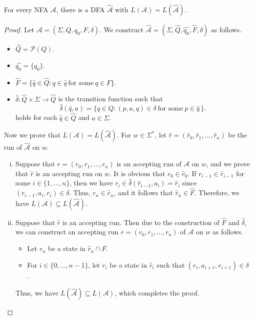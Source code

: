 \begin{theorem}\label{thm:dfa-nfa-equivalence}
  For every NFA $\mathcal{A}$, there is a DFA $\widehat{\mathcal{A}}$ with
  $L(\mathcal{A}) = L(\widehat{\mathcal{A}})$.
\end{theorem}
\begin{proof}
  Let $\mathcal{A} = (\Sigma, Q, q_0, F, \delta)$.
  We construct $\widehat{\mathcal{A}} = (\Sigma, \widehat{Q}, \widehat{q_0},
  \widehat{F}, \widehat{\delta})$ as follows.
  \begin{itemize}
    \item $\widehat{Q} = \mathcal{P}(Q)$.
    \item $\widehat{q_0} = \{q_0\}$.
    \item $\widehat{F} = \{\widehat{q} \in \widehat{Q}:
      q \in \widehat{q}\ \text{for some}\ q \in F\}$.
    \item $\widehat{\delta}: \widehat{Q} \times \Sigma \to \widehat{Q}$ is the
      transition function such that
      \begin{equation*}
        \widehat{\delta}(\widehat{q}, a) = \{q \in Q:
          (p, a, q) \in \delta\ \text{for some}\ p \in \widehat{q}\,\}.
      \end{equation*}
      holds for each $\widehat{q} \in \widehat{Q}$ and $a \in \Sigma$.
  \end{itemize}
  Now we prove that $L(\mathcal{A}) = L(\widehat{\mathcal{A}})$.
  For $w \in \Sigma^*$, let
  $\widehat{r} = (\widehat{r}_0, \widehat{r}_1, \dots, \widehat{r}_n)$ be
  the run of $\widehat{\mathcal{A}}$ on $w$.
  \begin{enumerate}[(i)]
    \item Suppose that $r = (r_0, r_1, \dots, r_n)$ is an accepting run of
      $\mathcal{A}$ on $w$, and we prove that $\widehat{r}$ is an accepting run
      on $w$.
      It is obvious that $r_0 \in \widehat{r}_0$.
      If $r_{i-1} \in \widehat{r}_{i-1}$ for some $i \in \{1, \dots, n\}$, then 
      we have $r_i \in \widehat\delta(\widehat{r}_{i-1}, a_i) = \widehat{r}_i$
      since $(r_{i-1}, a_i, r_i) \in \delta$.
      Thus, $r_n \in \widehat{r}_n$, and it follows that
      $\widehat{r}_n \in \widehat{F}$.
      Therefore, we have $L(\mathcal{A}) \subseteq L(\widehat{\mathcal{A}})$.
    \item Suppose that $\widehat{r}$ is an accepting run.
      Then due to the construction of $\widehat{F}$ and $\widehat\delta$, we
      can construct an accepting run $r = (r_0, r_1, \dots, r_n)$ of
      $\mathcal{A}$ on $w$ as follows.
      \begin{itemize}
        \item Let $r_n$ be a state in $\widehat{r}_n \cap F$.
        \item For $i \in \{0, \dots, n-1\}$, let $r_i$ be a state in
          $\widehat{r}_i$ such that $(r_i, a_{i+1}, r_{i+1}) \in \delta$.
      \end{itemize}
      Thus, we have $L(\widehat{\mathcal{A}}) \subseteq L(\mathcal{A})$,
      which completes the proof. \qedhere
  \end{enumerate}
\end{proof}